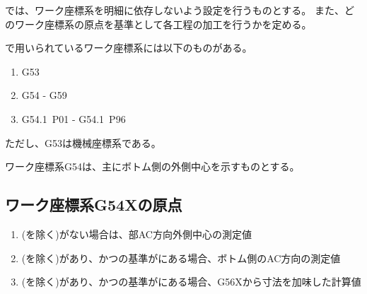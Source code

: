 

\DMC では、ワーク座標系を明細に依存しないよう設定を行うものとする。
また、どのワーク座標系の原点を基準として各工程の加工を行うかを定める。


\DMC で用いられているワーク座標系には以下のものがある。
\begin{enumerate}[label*=\sarrow]
\item {\ttfamily G53}
\item {\ttfamily G54} - {\ttfamily G59}
\item {\ttfamily G54.1~P01} - {\ttfamily G54.1~P96}
\end{enumerate}
ただし、{\ttfamily G53}は機械座標系である。



ワーク座標系{\ttfamily G54}は、主にボトム側の外側中心を示すものとする。


\subsection{ワーク座標系{\ttfamily G54X}の原点}
\begin{enumerate}[label*=\sarrow]
\item \BottomOutcut(\BottomCurvedOutcut を除く)がない場合は、\BottomEndFace 部AC方向外側中心の測定値
\item \BottomOutcut(\BottomCurvedOutcut を除く)があり、かつ\OutcutCenter の基準が\BottomOutcut にある場合、ボトム側のAC方向\OutcutCenter の測定値
\item \BottomOutcut(\BottomCurvedOutcut を除く)があり、かつ\OutcutCenter の基準が\TopOutcut にある場合、{\ttfamily G56X}から\CenterlineEndFaceDif 寸法を加味した計算値
\end{enumerate}



